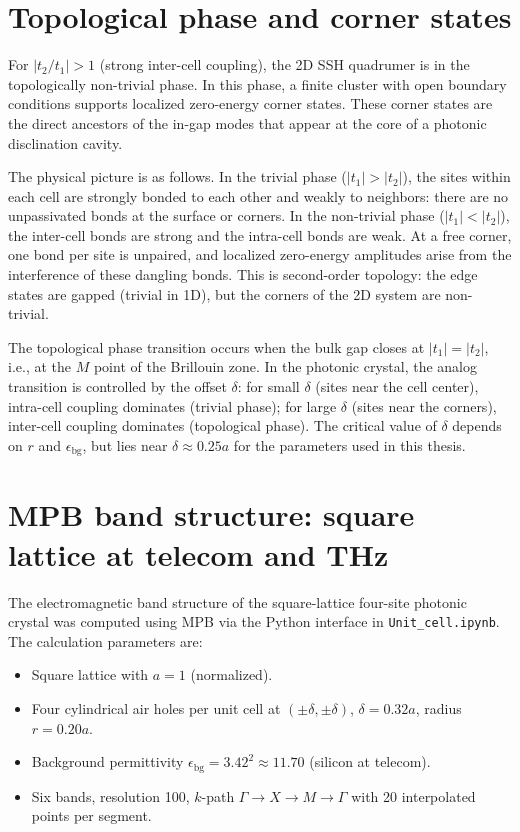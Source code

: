 \documentclass[12pt,a4paper,oneside]{book}
\theoremstyle{plain}
\theoremstyle{definition}
\theoremstyle{remark}
\newcommand{\eps}{\epsilon}
\begin{document}
\section{Topological phase and corner states}
\label{sec:topo-phase}

For $|t_2/t_1| > 1$ (strong inter-cell coupling), the 2D SSH quadrumer is in the topologically non-trivial phase. In this phase, a finite cluster with open boundary conditions supports localized zero-energy corner states. These corner states are the direct ancestors of the in-gap modes that appear at the core of a photonic disclination cavity.

The physical picture is as follows. In the trivial phase ($|t_1| > |t_2|$), the sites within each cell are strongly bonded to each other and weakly to neighbors: there are no unpassivated bonds at the surface or corners. In the non-trivial phase ($|t_1| < |t_2|$), the inter-cell bonds are strong and the intra-cell bonds are weak. At a free corner, one bond per site is unpaired, and localized zero-energy amplitudes arise from the interference of these dangling bonds. This is second-order topology: the edge states are gapped (trivial in 1D), but the corners of the 2D system are non-trivial.

The topological phase transition occurs when the bulk gap closes at $|t_1| = |t_2|$, i.e., at the $M$ point of the Brillouin zone. In the photonic crystal, the analog transition is controlled by the offset $\delta$: for small $\delta$ (sites near the cell center), intra-cell coupling dominates (trivial phase); for large $\delta$ (sites near the corners), inter-cell coupling dominates (topological phase). The critical value of $\delta$ depends on $r$ and $\eps_\mathrm{bg}$, but lies near $\delta \approx 0.25a$ for the parameters used in this thesis.

\section{MPB band structure: square lattice at telecom and THz}
\label{sec:mpb-bands}

The electromagnetic band structure of the square-lattice four-site photonic crystal was computed using MPB via the Python interface in \texttt{Unit\_cell.ipynb}. The calculation parameters are:

\begin{itemize}
  \item Square lattice with $a = 1$ (normalized).
  \item Four cylindrical air holes per unit cell at $(\pm\delta, \pm\delta)$, $\delta = 0.32a$, radius $r = 0.20a$.
  \item Background permittivity $\eps_\mathrm{bg} = 3.42^2 \approx 11.70$ (silicon at telecom).
  \item Six bands, resolution 100, $k$-path $\Gamma\!\to\!X\!\to\!M\!\to\!\Gamma$ with 20 interpolated points per segment.
\end{itemize}
\end{document}
